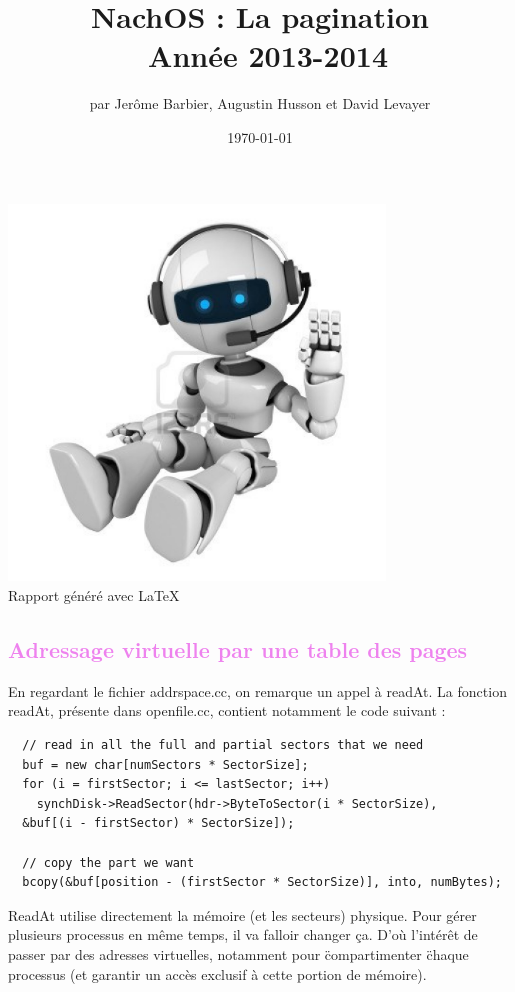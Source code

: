 \documentclass[a4paper,10pt]{article}
\title{NachOS : La pagination \\ Année 2013-2014}
\author{par Jerôme Barbier, Augustin Husson et David Levayer}
\date{\today}
\begin{document}
   \maketitle

  \begin{center}
    \includegraphics[width=10cm,height=10cm]{../partie3/robottrading.jpg}\\
    Rapport généré avec \LaTeX
  \end{center}
  \tableofcontents
  \newpage
  
  \textcolor{Violet}{\section{Adressage virtuelle par une table des pages}}

  En regardant le fichier addrspace.cc, on remarque un appel à readAt. La fonction readAt, présente dans openfile.cc, contient notamment le code suivant :

  \begin{lstlisting}
  // read in all the full and partial sectors that we need
  buf = new char[numSectors * SectorSize];
  for (i = firstSector; i <= lastSector; i++) 
    synchDisk->ReadSector(hdr->ByteToSector(i * SectorSize), 
  &buf[(i - firstSector) * SectorSize]);

  // copy the part we want
  bcopy(&buf[position - (firstSector * SectorSize)], into, numBytes);
  \end{lstlisting}

  ReadAt utilise directement la mémoire (et les secteurs) physique. Pour gérer plusieurs processus en même temps, il va falloir changer ça. D'où l'intérêt de passer par des adresses virtuelles, notamment pour \"compartimenter \" chaque processus (et garantir un accès exclusif à cette portion de mémoire).
\end{document}
